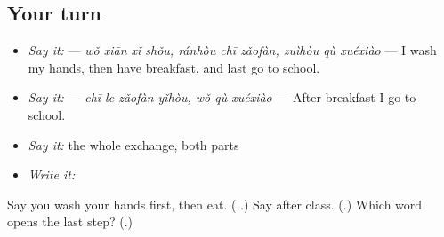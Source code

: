 \subsection*{Your turn}
\begin{itemize}
\raggedright
  \item \emph{Say it:}    — \emph{wǒ xiān xǐ shǒu, ránhòu chī zǎofàn, zuìhòu qù xuéxiào} — I wash my hands, then have breakfast, and last go to school.
  \item \emph{Say it:}   — \emph{chī le zǎofàn yǐhòu, wǒ qù xuéxiào} — After breakfast I go to school.
  \item \emph{Say it:} the whole exchange, both parts
  \item \emph{Write it:}  
\end{itemize}

\begin{tcolorbox}[breakable,colback=teal!4,colframe=teal!35!black,title={Before you move on}]
Say you wash your hands first, then eat. (\textbf{ }.) Say after class. (\textbf{}.) Which word opens the last step? (\textbf{}.)
\end{tcolorbox}
